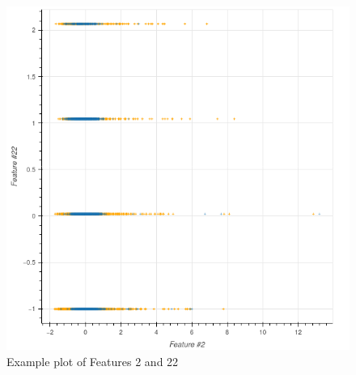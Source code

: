 \documentclass[10pt,conference,compsocconf]{IEEEtran}
\begin{document}
\begin{figure}
	\includegraphics[width=\columnwidth]{f2-f22.png}
	\caption{Example plot of Features 2 and 22}
	\label{f2-f22}
\end{figure}



\end{document}
